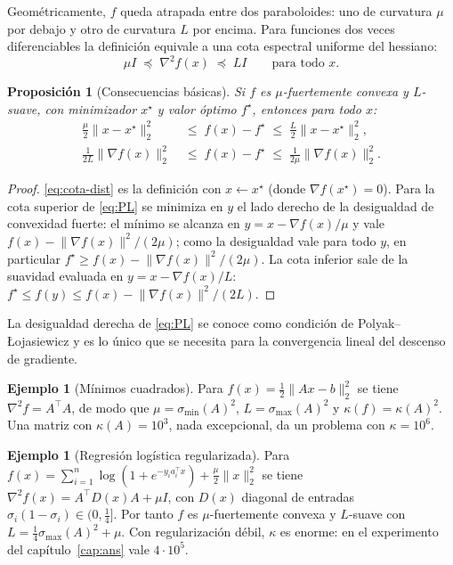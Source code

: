 \documentclass[11pt,a4paper,oneside]{book}
\newtheorem{proposicion}[teorema]{Proposición}
\theoremstyle{definition}
\newtheorem{ejemplo}[teorema]{Ejemplo}
\theoremstyle{remark}
\newcommand{\T}{^{\top}}
\newcommand{\nrm}[1]{\lVert #1\rVert}
\begin{document}
Geométricamente, $f$ queda atrapada entre dos paraboloides: uno de curvatura $\mu$ por debajo y otro de
curvatura $L$ por encima. Para funciones dos veces diferenciables la definición equivale a una cota espectral
uniforme del hessiano:
\begin{equation}\label{eq:mu-L-hess}
  \mu I \;\preceq\; \nabla^2 f(x)\;\preceq\; L I \qquad\text{para todo } x .
\end{equation}

\begin{proposicion}[Consecuencias básicas]\label{prop:mu-L-consec}
Si $f$ es $\mu$-fuertemente convexa y $L$-suave, con minimizador $x^\star$ y valor óptimo $f^\star$, entonces para todo $x$:
\begin{align}
  \frac{\mu}{2}\nrm{x-x^\star}_2^2 \;&\le\; f(x)-f^\star \;\le\; \frac{L}{2}\nrm{x-x^\star}_2^2, \label{eq:cota-dist}\\
  \frac{1}{2L}\nrm{\nabla f(x)}_2^2 \;&\le\; f(x)-f^\star \;\le\; \frac{1}{2\mu}\nrm{\nabla f(x)}_2^2. \label{eq:PL}
\end{align}
\end{proposicion}

\begin{proof}
\eqref{eq:cota-dist} es la definición con $x\leftarrow x^\star$ (donde $\nabla f(x^\star)=0$). Para la cota
superior de \eqref{eq:PL} se minimiza en $y$ el lado derecho de la desigualdad de convexidad fuerte: el mínimo
se alcanza en $y=x-\nabla f(x)/\mu$ y vale $f(x)-\nrm{\nabla f(x)}^2/(2\mu)$; como la desigualdad vale para todo $y$,
en particular $f^\star\ge f(x)-\nrm{\nabla f(x)}^2/(2\mu)$. La cota inferior sale de la suavidad evaluada en
$y=x-\nabla f(x)/L$: $f^\star\le f(y)\le f(x)-\nrm{\nabla f(x)}^2/(2L)$.
\end{proof}

La desigualdad derecha de \eqref{eq:PL} se conoce como condición de Polyak--Łojasiewicz y es lo único que se
necesita para la convergencia lineal del descenso de gradiente.

\begin{ejemplo}[Mínimos cuadrados]\label{ej:ls-mu-L}
Para $f(x)=\tfrac12\nrm{Ax-b}_2^2$ se tiene $\nabla^2 f=A\T A$, de modo que $\mu=\sigma_{\min}(A)^2$,
$L=\sigma_{\max}(A)^2$ y $\kappa(f)=\kappa(A)^2$. Una matriz con $\kappa(A)=10^3$, nada excepcional, da un
problema con $\kappa=10^6$.
\end{ejemplo}

\begin{ejemplo}[Regresión logística regularizada]\label{ej:logistica-mu-L}
Para $f(x)=\sum_{i=1}^n\log(1+e^{-y_i a_i\T x})+\tfrac{\mu}{2}\nrm{x}_2^2$ se tiene
$\nabla^2 f(x)=A\T D(x)A+\mu I$, con $D(x)$ diagonal de entradas $\sigma_i(1-\sigma_i)\in(0,\tfrac14]$. Por tanto
$f$ es $\mu$-fuertemente convexa y $L$-suave con $L=\tfrac14\sigma_{\max}(A)^2+\mu$. Con regularización débil,
$\kappa$ es enorme: en el experimento del capítulo~\ref{cap:ans} vale $4\cdot 10^5$.
\end{ejemplo}
\end{document}
